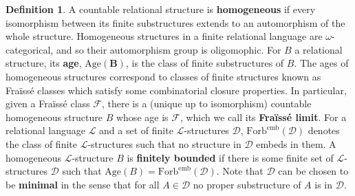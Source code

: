 \documentclass{article}
\theoremstyle{remark}
\theoremstyle{definition}
\newtheorem{definition}[theorem]{Definition}
\begin{document}
\begin{definition}
A countable relational structure is \textbf{homogeneous} if every isomorphism between its finite substructures extends to an automorphism of the whole structure. Homogeneous structures in a finite relational language are $\omega$-categorical, and so their automorphism group is oligomophic. For $B$ a relational structure, its \textbf{age}, $\bm{\mathrm{Age}(B)}$, is the class of finite substructures of $B$. The ages of homogeneous structures correspond to classes of finite structures known as Fra\"{i}ss\'{e} classes which satisfy some combinatorial closure properties. In particular, given a Fra\"{i}ss\'{e} class $\mathcal{F}$, there is a (unique up to isomorphism) countable homogeneous structure $B$ whose age is $\mathcal{F}$, which we call its \textbf{Fra\"{i}ss\'{e} limit}. For a relational language $\mathcal{L}$ and a set of finite $\mathcal{L}$-structures $\mathcal{D}$, $\bm{\mathrm{Forb}^{\mathrm{emb}}(\mathcal{D})}$ denotes the class of finite $\mathcal{L}$-structures such that no structure in $\mathcal{D}$ embeds in them. A homogeneous $\mathcal{L}$-structure $B$ is \textbf{finitely bounded} if there is some finite set of $\mathcal{L}$-structures $\mathcal{D}$ such that $\mathrm{Age}(B)=\mathrm{Forb}^{\mathrm{emb}}(\mathcal{D})$. Note that $\mathcal{D}$ can be chosen to be \textbf{minimal} in the sense that for all $A\in\mathcal{D}$ no proper substructure of $A$ is in $\mathcal{D}$.
\end{definition}
\end{document}
